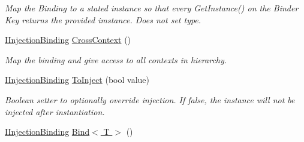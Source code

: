 \begin{DoxyCompactItemize}
\begin{DoxyCompactList}\small\item\em Map the Binding to a stated instance so that every {\ttfamily Get\-Instance()} on the Binder Key returns the provided imstance. Does not set type. \end{DoxyCompactList}\item 
\hypertarget{classstrange_1_1extensions_1_1injector_1_1impl_1_1_injection_binding_abd9f222c9ad96768dd1cd9ce76d31f7b}{\hyperlink{interfacestrange_1_1extensions_1_1injector_1_1api_1_1_i_injection_binding}{I\-Injection\-Binding} \hyperlink{classstrange_1_1extensions_1_1injector_1_1impl_1_1_injection_binding_abd9f222c9ad96768dd1cd9ce76d31f7b}{Cross\-Context} ()}\label{classstrange_1_1extensions_1_1injector_1_1impl_1_1_injection_binding_abd9f222c9ad96768dd1cd9ce76d31f7b}

\begin{DoxyCompactList}\small\item\em Map the binding and give access to all contexts in hierarchy. \end{DoxyCompactList}\item 
\hypertarget{classstrange_1_1extensions_1_1injector_1_1impl_1_1_injection_binding_a03d3a22f0e3cad47d20c337d7a5aa224}{\hyperlink{interfacestrange_1_1extensions_1_1injector_1_1api_1_1_i_injection_binding}{I\-Injection\-Binding} \hyperlink{classstrange_1_1extensions_1_1injector_1_1impl_1_1_injection_binding_a03d3a22f0e3cad47d20c337d7a5aa224}{To\-Inject} (bool value)}\label{classstrange_1_1extensions_1_1injector_1_1impl_1_1_injection_binding_a03d3a22f0e3cad47d20c337d7a5aa224}

\begin{DoxyCompactList}\small\item\em Boolean setter to optionally override injection. If false, the instance will not be injected after instantiation. \end{DoxyCompactList}\item 
\hypertarget{classstrange_1_1extensions_1_1injector_1_1impl_1_1_injection_binding_aa554c0eb764085090478664db21467df}{\hyperlink{interfacestrange_1_1extensions_1_1injector_1_1api_1_1_i_injection_binding}{I\-Injection\-Binding} \hyperlink{classstrange_1_1extensions_1_1injector_1_1impl_1_1_injection_binding_aa554c0eb764085090478664db21467df}{Bind$<$ T $>$} ()}\label{classstrange_1_1extensions_1_1injector_1_1impl_1_1_injection_binding_aa554c0eb764085090478664db21467df}


\end{DoxyCompactItemize}
